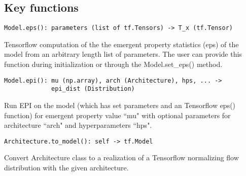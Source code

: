 \documentclass[11pt]{article}
\begin{document}

\subsection{Key functions}
\begin{verbatim}
Model.eps(): parameters (list of tf.Tensors) -> T_x (tf.Tensor)
\end{verbatim}
Tensorflow computation of the the emergent property statistics (eps) of the model  from an arbitrary length list of parameters.  The user can provide this function during initialization or through the Model.set\_eps() method.

\begin{verbatim}
Model.epi(): mu (np.array), arch (Architecture), hps, ... -> 
             epi_dist (Distribution)
\end{verbatim}
Run EPI on the model (which has set parameters and an Tensorflow eps() function) for emergent property value ``mu" with optional parameters for architecture ``arch" and hyperparameters ``hps".

\begin{verbatim}
Architecture.to_model(): self -> tf.Model
\end{verbatim}
Convert Architecture class to a realization of a Tensorflow normalizing flow distribution with the given architecture.
\end{document}
